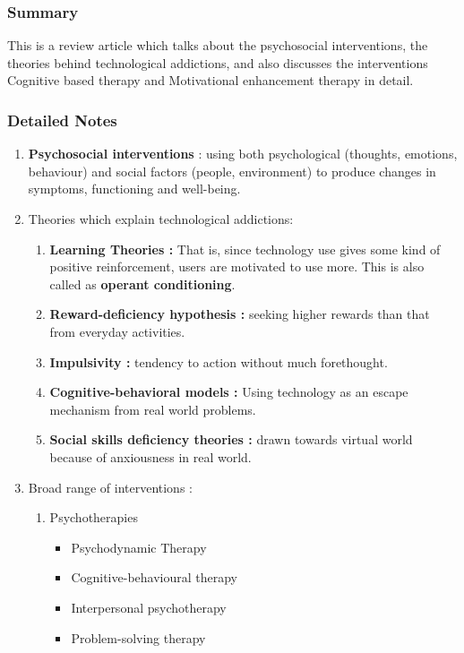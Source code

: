 \documentclass{article}
\begin{document}
\subsubsection{Summary}
This is a review article which talks about the psychosocial interventions, the theories behind technological addictions, and also discusses the interventions Cognitive based therapy and Motivational enhancement therapy in detail.

\subsubsection{Detailed Notes}
\begin{enumerate}
    \item \textbf{Psychosocial interventions} : using both psychological (thoughts, emotions, behaviour) and social factors (people, environment) to produce changes in symptoms, functioning and well-being.
    \item Theories which explain technological addictions: 
    \begin{enumerate}
        \item \textbf{Learning Theories :} That is, since technology use gives some kind of positive reinforcement, users are motivated to use more. This is also called as \textbf{operant conditioning}.
        \item \textbf{Reward-deficiency hypothesis :} seeking higher rewards than that from everyday activities.
        \item \textbf{Impulsivity :} tendency to action without much forethought.
        \item \textbf{Cognitive-behavioral models :} Using technology as an escape mechanism from real world problems.
        \item \textbf{Social skills deficiency theories :} drawn towards virtual world because of anxiousness in real world.
    \end{enumerate}
    \item Broad range of interventions :
    \begin{enumerate}
        \item Psychotherapies
        \begin{itemize}
            \item Psychodynamic Therapy
            \item Cognitive-behavioural therapy
            \item Interpersonal psychotherapy
            \item Problem-solving therapy

\end{itemize}
\end{enumerate}
\end{enumerate}
\end{document}
